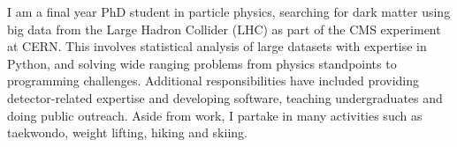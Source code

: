 
\begin{cvparagraph}
I am a final year PhD student in particle physics, searching for dark matter using big data from the Large Hadron Collider (LHC) as part of the CMS experiment at CERN. This involves statistical analysis of large datasets with expertise in Python, and solving wide ranging problems from physics standpoints to programming challenges. Additional responsibilities have included providing detector-related expertise and developing software, teaching undergraduates and doing public outreach. Aside from work, I partake in many activities such as taekwondo, weight lifting, hiking and skiing.
\end{cvparagraph}
